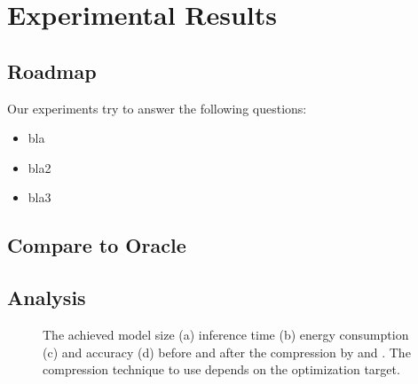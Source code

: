 \section{Experimental Results}


\subsection{Roadmap}
Our experiments try to answer the following questions:

\begin{itemize}
\item bla
\item bla2
\item bla3
\end{itemize}




\subsection{Compare to Oracle}


\subsection{Analysis}

\begin{figure}[!t]
\centering
{}
\hfill
{}
\hfill

\caption{The achieved model size (a) inference time (b) energy consumption (c) and accuracy (d) before and after the compression by \quantization and \pruning.
The compression technique to use depends on the optimization target.}
\label{fig:analy_quan}
\end{figure}


